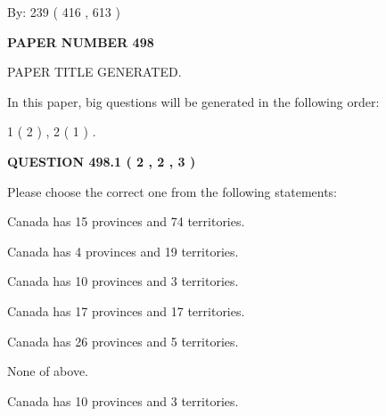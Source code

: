 \documentclass[12pt]{article}
\begin{document}
   
\hspace{1.0in} By: 
 239 ( 416 ,  613 )
   
   
   
   
\newpage 
\setcounter{page}{ 
   498001 } 
   
   
   
   
 {\textbf{ \Large{ PAPER NUMBER  498  }}}
   
   
\vspace{0.2in}
   
   
   
   
   
   
   
   
 \vspace{0.2in}
 
 
 
 
   
   
 PAPER TITLE GENERATED.
   
   
   
\vspace{0.2in}
   
In this paper, big questions will be generated in the following order: 
   
   
   1 ( 2 )
 ,
   2 ( 1 )
 .
  
\vspace{0.2in}
  
{\textbf{\Large{QUESTION
498.1 
 ( 2 , 2 , 3 )
}}}
  
  
Please choose the correct one from the following statements:
 
 
Canada has  15 provinces and  74 territories.
 
 
Canada has   4 provinces and  19 territories.
 
 
Canada has 10  provinces and 3 territories.
 
 
Canada has  17 provinces and  17 territories.
 
 
Canada has  26 provinces and  5 territories.
 
 
 None of above.
 
 
\noindent{}
 
 
Canada has 10  provinces and 3 territories.
 
\end{document}
